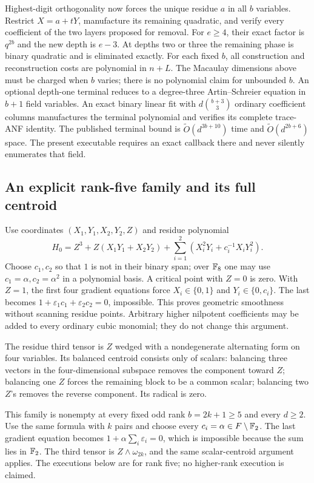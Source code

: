 Highest-digit orthogonality now forces the unique residue $a$ in all
$b$ variables. Restrict $X=a+tY$, manufacture its remaining quadratic,
and verify every coefficient of the two layers proposed for removal.
For $e\ge4$, their exact factor is $q^{2b}$ and the new depth is $e-3$.
At depths two or three the remaining phase is binary quadratic and is
eliminated exactly. For each fixed $b$, all construction and reconstruction
costs are polynomial in $n+L$. The Macaulay dimensions above must be
charged when $b$ varies; there is no polynomial claim for unbounded $b$.
An optional depth-one terminal reduces to a degree-three
Artin--Schreier equation in $b+1$ field variables. An exact binary linear
fit with $d\binom{b+3}{3}$ ordinary coefficient columns manufactures the
terminal polynomial and verifies its complete trace-ANF identity. The published terminal
bound is $\widetilde O(d^{3b+10})$ time and
$\widetilde O(d^{2b+6})$ space. The present executable requires an exact
callback there and never silently enumerates that field.

\subsection{An explicit rank-five family and its full centroid}
Use coordinates $(X_1,Y_1,X_2,Y_2,Z)$ and residue polynomial
\[
 H_0=Z^3+Z(X_1Y_1+X_2Y_2)+
 \sum_{i=1}^2\left(X_i^2Y_i+c_i^{-1}X_iY_i^2\right).
\]
Choose $c_1,c_2$ so that $1$ is not in their binary span; over $\mathbb F_8$
one may use $c_1=\alpha,c_2=\alpha^2$ in a polynomial basis.
A critical point with $Z=0$ is zero. With $Z=1$, the first four gradient
equations force $X_i\in\{0,1\}$ and $Y_i\in\{0,c_i\}$.
The last becomes $1+\varepsilon_1c_1+\varepsilon_2c_2=0$, impossible.
This proves geometric smoothness without scanning residue points.
Arbitrary higher nilpotent coefficients may be added to every ordinary
cubic monomial; they do not change this argument.

The residue third tensor is $Z$ wedged with a nondegenerate alternating
form on four variables. Its balanced centroid consists only of scalars:
balancing three vectors in the four-dimensional subspace removes the
component toward $Z$; balancing one $Z$ forces the remaining block to
be a common scalar; balancing two $Z$'s removes the reverse component.
Its radical is zero.

This family is nonempty at every fixed odd rank $b=2k+1\ge5$ and
every $d\ge2$. Use the same formula with $k$ pairs and choose every
$c_i=\alpha\in F\setminus\mathbb F_2$. The last gradient equation becomes
$1+\alpha\sum_i\varepsilon_i=0$, which is impossible because the
sum lies in $\mathbb F_2$. The third tensor is $Z\wedge\omega_{2k}$, and
the same scalar-centroid argument applies. The executions below are
for rank five; no higher-rank execution is claimed.

